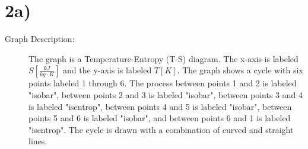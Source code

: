 

\section*{2a)}

\begin{description}
    \item[Graph Description:] The graph is a Temperature-Entropy (T-S) diagram. The x-axis is labeled $S \left[ \frac{kJ}{kg \cdot K} \right]$ and the y-axis is labeled $T \left[ K \right]$. The graph shows a cycle with six points labeled 1 through 6. The process between points 1 and 2 is labeled "isobar", between points 2 and 3 is labeled "isobar", between points 3 and 4 is labeled "isentrop", between points 4 and 5 is labeled "isobar", between points 5 and 6 is labeled "isobar", and between points 6 and 1 is labeled "isentrop". The cycle is drawn with a combination of curved and straight lines.
\end{description}